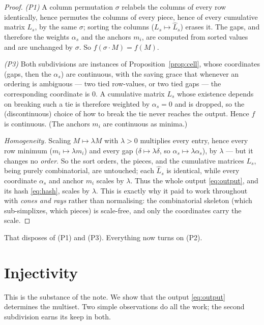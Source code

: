 \documentclass[11pt,a4paper]{article}
\theoremstyle{definition}
\theoremstyle{plain}
\newcommand{\bary}{\widehat}      %
\begin{document}
\begin{proof}
\emph{(P1)} A column permutation $\sigma$ relabels the columns of every row
identically, hence permutes the columns of every piece, hence of every
cumulative matrix $L_s$, by the same $\sigma$; sorting the columns
($L_s\mapsto\bary L_s$) erases it. The gaps, and therefore the weights
$\alpha_s$ and the anchors $m_i$, are computed from sorted values and are
unchanged by $\sigma$. So $f(\sigma\cdot M)=f(M)$.

\emph{(P3)} Both subdivisions are instances of
Proposition~\ref{prop:cell}, whose coordinates (gaps, then the $\alpha_s$) are
continuous, with the saving grace that whenever an ordering is ambiguous --- two
tied row-values, or two tied gaps --- the corresponding coordinate is $0$. A
cumulative matrix $L_s$ whose existence depends on breaking such a tie is
therefore weighted by $\alpha_s=0$ and is dropped, so the (discontinuous) choice
of how to break the tie never reaches the output. Hence $f$ is continuous. (The
anchors $m_i$ are continuous as minima.)

\emph{Homogeneity.} Scaling $M\mapsto\lambda M$ with $\lambda>0$ multiplies every
entry, hence every row minimum ($m_i\mapsto\lambda m_i$) and every gap
($\delta\mapsto\lambda\delta$, so $\alpha_s\mapsto\lambda\alpha_s$), by
$\lambda$ --- but it changes no \emph{order}. So the sort orders, the pieces, and
the cumulative matrices $L_s$, being purely combinatorial, are untouched; each
$\bary L_s$ is identical, while every coordinate $\alpha_s$ and anchor $m_i$
scales by $\lambda$. Thus the whole output \eqref{eq:output}, and its hash
\eqref{eq:hash}, scales by $\lambda$. This is exactly why it paid to work
throughout with \emph{cones and rays} rather than normalising: the combinatorial
skeleton (which sub-simplixes, which pieces) is scale-free, and only the coordinates
carry the scale.
\end{proof}

\noindent
That disposes of (P1) and (P3). Everything now turns on (P2).

\section{Injectivity}
\label{sec:inj}

This is the substance of the note. We show that the output \eqref{eq:output}
determines the multiset. Two simple observations do all the work; the second
subdivision earns its keep in both.
\end{document}
